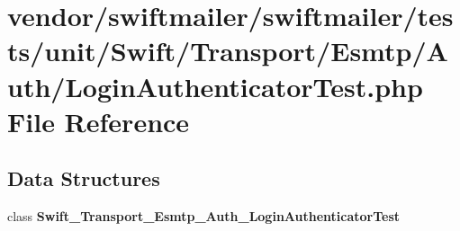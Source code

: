 \section{vendor/swiftmailer/swiftmailer/tests/unit/\+Swift/\+Transport/\+Esmtp/\+Auth/\+Login\+Authenticator\+Test.php File Reference}
\label{_login_authenticator_test_8php}
\subsection*{Data Structures}
\begin{DoxyCompactItemize}
\item 
class {\bf Swift\+\_\+\+Transport\+\_\+\+Esmtp\+\_\+\+Auth\+\_\+\+Login\+Authenticator\+Test}
\end{DoxyCompactItemize}

